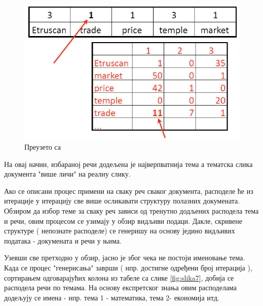 \begin{figure}[H]
    \centering
   \includegraphics[scale=0.6]{./Slike/slika11.png} 
	\caption{Преузето са \cite{mimno1}}
	\label{fig:slika11}
\end{figure}


На овај начин, избараној речи додељена је најверпватнија тема а тематска слика документа "више личи" на реалну слику. 

Ако се описани процес примени на сваку реч сваког документа, расподеле ће из итерације у итерацију све више осликавати структуру полазних докумената. Обзиром да избор теме за сваку реч зависи од тренутно додљених расподела тема и речи, овим процесом се узимају у обзир видљиви подаци. Дакле, скривене структуре ( непознате расподеле) се генеришу на основу једино видљивих података - докумената и речи у њима.

Узевши све претходно у обзир, јасно је због чека не постоји именовање тема. Када се процес "генерисања"   заврши ( нпр. достигне  одређени број итерација ), сортирањем одговарајућих колона из табеле са слике \ref{fig:slika7}, добија се  расподела речи по темама. На основу експретског знања овим расподелама додељују се имена - нпр. тема 1 - математика, тема 2- економија итд.
























